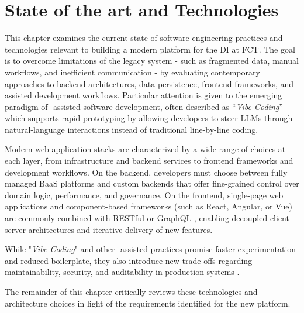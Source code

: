 %

\chapter{State of the art and Technologies}
\label{cha:state_of_the_art}


\epigraphfontsize{\small\itshape}
\setlength\epigraphwidth{12.5cm}
\setlength\epigraphrule{0pt}

{
    This chapter examines the current state of software engineering practices and technologies relevant to building 
    a modern platform for the \gls{DI} at  \gls{FCT}. The goal is to overcome limitations of the legacy system - 
    such as fragmented data, manual workflows, and inefficient communication - by evaluating contemporary approaches to backend 
    architectures, data persistence, frontend frameworks, and -assisted development workflows. Particular attention is given to the emerging 
    paradigm of -assisted software development, often described as “\textit{Vibe Coding}” \cite{figma-vibecoding-2025} which supports rapid prototyping by allowing developers to 
    steer \glspl{LLM} through natural-language interactions instead of traditional line-by-line coding.
}

{
    Modern web application stacks are characterized by a wide range of choices at each layer, from infrastructure and backend services to frontend 
    frameworks and development workflows. On the backend, developers must choose between fully managed \gls{BaaS}
    platforms \cite{lertaul-2014-ebaas, dbapi-2025-baas-platform} and 
    custom backends that offer fine-grained control over domain logic, performance, and governance. 
    On the frontend, single-page web applications and 
    component-based frameworks (such as React, Angular, or Vue) are commonly combined with RESTful or GraphQL , enabling decoupled 
    client-server architectures and iterative delivery of new features.
}

{
    While "\textit{Vibe Coding}" and other -assisted practices promise faster experimentation and reduced
    boilerplate, they also introduce new trade-offs regarding maintainability, security, and auditability in production systems \cite{devto-vibe-coding-2025}. 
}

{
    The remainder of this chapter critically reviews these technologies and architecture choices in light of the requirements
    identified for the new platform.
}


